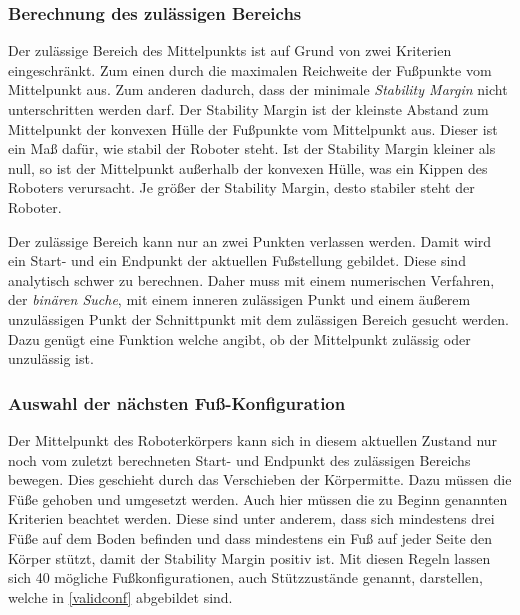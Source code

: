 \subsubsection{Berechnung des zulässigen Bereichs}

Der zulässige Bereich des Mittelpunkts ist auf Grund von zwei Kriterien eingeschränkt. Zum einen durch die maximalen Reichweite der Fußpunkte vom Mittelpunkt aus. Zum anderen dadurch, dass der minimale \emph{Stability Margin} nicht unterschritten werden darf. Der Stability Margin ist der kleinste Abstand zum Mittelpunkt der konvexen Hülle der Fußpunkte vom Mittelpunkt aus. Dieser ist ein Maß dafür, wie stabil der Roboter steht. Ist der Stability Margin kleiner als null, so ist der Mittelpunkt außerhalb der konvexen Hülle, was ein Kippen des Roboters verursacht. Je größer der Stability Margin, desto stabiler steht der Roboter.

Der zulässige Bereich kann nur an zwei Punkten verlassen werden. Damit wird ein Start- und ein Endpunkt der aktuellen Fußstellung gebildet. Diese sind analytisch schwer zu berechnen. Daher muss mit einem numerischen Verfahren, der \emph{binären Suche}, mit einem inneren zulässigen Punkt und einem äußerem unzulässigen Punkt der Schnittpunkt mit dem zulässigen Bereich gesucht werden. Dazu genügt eine Funktion welche angibt, ob der Mittelpunkt zulässig oder unzulässig ist.

\subsubsection{Auswahl der nächsten Fuß-Konfiguration}

Der Mittelpunkt des Roboterkörpers kann sich in diesem aktuellen Zustand nur noch vom zuletzt berechneten Start- und Endpunkt des zulässigen Bereichs bewegen. Dies geschieht durch das Verschieben der Körpermitte. Dazu müssen die Füße gehoben und umgesetzt werden. Auch hier müssen die zu Beginn genannten Kriterien beachtet werden. Diese sind unter anderem, dass sich mindestens drei Füße auf dem Boden befinden und dass mindestens ein Fuß auf jeder Seite den Körper stützt, damit der Stability Margin positiv ist. Mit diesen Regeln lassen sich 40 mögliche Fußkonfigurationen, auch Stützzustände genannt, darstellen, welche in \autoref{validconf} abgebildet sind.

